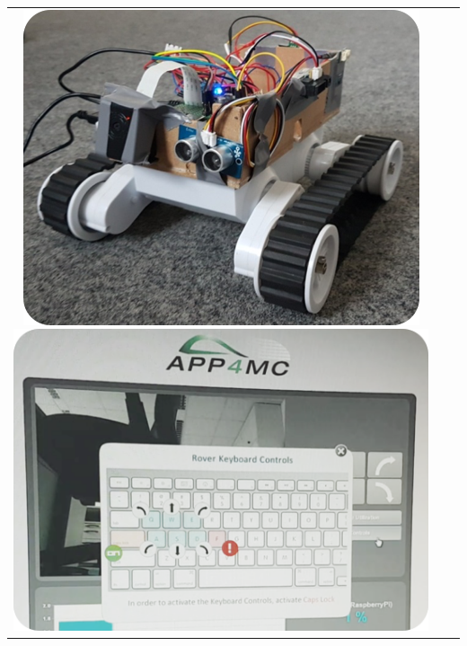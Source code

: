 \begin{tabularx}{\textwidth}{cXc}
		\includegraphics{rover.png}%
		\includegraphics{page.png}%
\end{tabularx}
